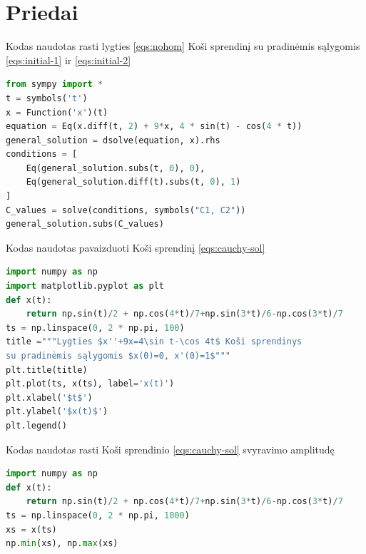 \documentclass[11pt]{article}
\begin{document}
\section{Priedai}
Kodas naudotas rasti lygties \eqref{eqs:nohom} Koši sprendinį su pradinėmis sąlygomis \eqref{eqs:initial-1} ir \eqref{eqs:initial-2}
\begin{lstlisting}[language=Python]
from sympy import *
t = symbols('t')
x = Function('x')(t)
equation = Eq(x.diff(t, 2) + 9*x, 4 * sin(t) - cos(4 * t))
general_solution = dsolve(equation, x).rhs
conditions = [
    Eq(general_solution.subs(t, 0), 0),
    Eq(general_solution.diff(t).subs(t, 0), 1)
]
C_values = solve(conditions, symbols("C1, C2"))
general_solution.subs(C_values)
\end{lstlisting}
\newpage
Kodas naudotas pavaizduoti Koši sprendinį \eqref{eqs:cauchy-sol}
\begin{lstlisting}[language=Python]
import numpy as np
import matplotlib.pyplot as plt
def x(t):
    return np.sin(t)/2 + np.cos(4*t)/7+np.sin(3*t)/6-np.cos(3*t)/7
ts = np.linspace(0, 2 * np.pi, 100)
title ="""Lygties $x''+9x=4\sin t-\cos 4t$ Koši sprendinys
su pradinėmis sąlygomis $x(0)=0, x'(0)=1$"""
plt.title(title)
plt.plot(ts, x(ts), label='x(t)')
plt.xlabel('$t$')
plt.ylabel('$x(t)$')
plt.legend()
\end{lstlisting}
Kodas naudotas rasti Koši sprendinio \eqref{eqs:cauchy-sol} svyravimo amplitudę
\begin{lstlisting}[language=Python]
import numpy as np
def x(t):
    return np.sin(t)/2 + np.cos(4*t)/7+np.sin(3*t)/6-np.cos(3*t)/7
ts = np.linspace(0, 2 * np.pi, 1000)
xs = x(ts)
np.min(xs), np.max(xs)
\end{lstlisting}
\end{document}
